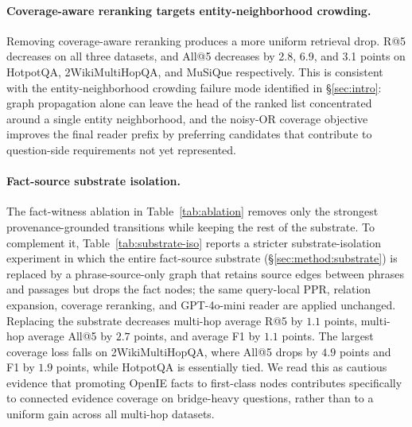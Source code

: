 \paragraph{Coverage-aware reranking targets entity-neighborhood crowding.}
Removing coverage-aware reranking produces a more uniform retrieval
drop. R@5 decreases on all three datasets, and All@5 decreases by 2.8,
6.9, and 3.1 points on HotpotQA, 2WikiMultiHopQA, and MuSiQue
respectively. This is consistent with the entity-neighborhood
crowding failure mode identified in \S\ref{sec:intro}: graph
propagation alone can leave the head of the
ranked list concentrated around a single entity neighborhood, and the
noisy-OR coverage objective improves the final reader prefix by
preferring candidates that contribute to question-side requirements
not yet represented.

\paragraph{Fact-source substrate isolation.}
The fact-witness ablation in Table~\ref{tab:ablation} removes only
the strongest provenance-grounded transitions while keeping the rest
of the substrate. To complement it, Table~\ref{tab:substrate-iso}
reports a stricter substrate-isolation experiment in which the entire
fact-source substrate (\S\ref{sec:method:substrate}) is replaced by a
phrase-source-only graph that retains source edges between phrases
and passages but drops the fact nodes; the same query-local PPR,
relation expansion, coverage reranking, and GPT-4o-mini reader are
applied unchanged. Replacing the substrate decreases multi-hop
average R@5 by $1.1$ points, multi-hop average All@5 by $2.7$
points, and average F1 by $1.1$ points. The largest coverage loss
falls on 2WikiMultiHopQA, where All@5 drops by $4.9$ points and F1
by $1.9$ points, while HotpotQA is essentially tied. We read this
as cautious evidence that promoting OpenIE facts to first-class
nodes contributes specifically to connected evidence coverage on
bridge-heavy questions, rather than to a uniform gain across all
multi-hop datasets.

